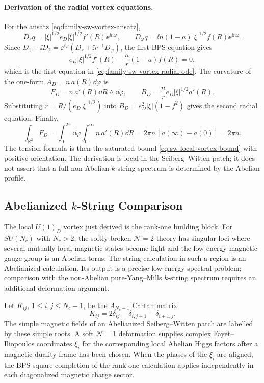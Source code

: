 \paragraph{Derivation of the radial vortex equations.}
For the ansatz \eqref{eq:family-sw-vortex-ansatz},
\[
  D_rq=|\xi|^{1/2}e_D|\xi|^{1/2}f'(R)\ee^{\ii n\varphi},
  \qquad
  D_\varphi q=\ii n(1-a)|\xi|^{1/2}f(R)\ee^{\ii n\varphi}.
\]
Since \(D_1+\ii D_2=\ee^{\ii\varphi}(D_r+\ii r^{-1}D_\varphi)\), the first BPS
equation gives
\[
  e_D|\xi|^{1/2}f'(R)-\frac{n}{r}(1-a)f(R)=0,
\]
which is the first equation in \eqref{eq:family-sw-vortex-radial-ode}.  The
curvature of the one-form \(A_D=n\,a(R)\dd\varphi\) is
\[
  F_D=n\,a'(R)\dd R\wedge\dd\varphi,
  \qquad
  B_D=\frac{n}{r}e_D|\xi|^{1/2}a'(R).
\]
Substituting \(r=R/(e_D|\xi|^{1/2})\) into
\(B_D=e_D^2|\xi|(1-f^2)\) gives the second radial equation.  Finally,
\[
  \int_{\mathbb R^2}F_D
  =
  \int_0^{2\pi}\!\dd\varphi\int_0^\infty n\,a'(R)\dd R
  =
  2\pi n\,[a(\infty)-a(0)]
  =
  2\pi n .
\]
The tension formula is then the saturated bound
\eqref{eq:sw-local-vortex-bound} with positive orientation.  The derivation is
local in the Seiberg--Witten patch; it does not assert that a full non-Abelian
\(k\)-string spectrum is determined by the Abelian profile.

\subsection[Abelianized k-String Comparison]{Abelianized \(k\)-String Comparison}

The local \(U(1)_D\) vortex just derived is the rank-one building block.  For
\(SU(N_c)\) with \(N_c>2\), the softly broken \(\mathcal N=2\) theory has
singular loci where several mutually local magnetic states become light and
the low-energy magnetic gauge group is an Abelian torus.  The string
calculation in such a region is an Abelianized calculation.  Its output is a
precise low-energy spectral problem; comparison with the non-Abelian
pure-Yang--Mills \(k\)-string spectrum requires an additional deformation
argument.

Let \(K_{ij}\), \(1\le i,j\le N_c-1\), be the \(A_{N_c-1}\) Cartan matrix
\begin{equation}
  K_{ij}=2\delta_{ij}-\delta_{i,j+1}-\delta_{i+1,j}.
  \label{eq:an-minus-one-cartan-matrix}
\end{equation}
The simple magnetic fields of an Abelianized Seiberg--Witten patch are
labelled by these simple roots.  A soft \(\mathcal N=1\) deformation supplies
complex Fayet--Iliopoulos coordinates \(\xi_i\) for the corresponding local
Abelian Higgs factors after a magnetic duality frame has been chosen.  When
the phases of the \(\xi_i\) are aligned, the BPS square completion of the
rank-one calculation applies independently in each diagonalized magnetic
charge sector.

